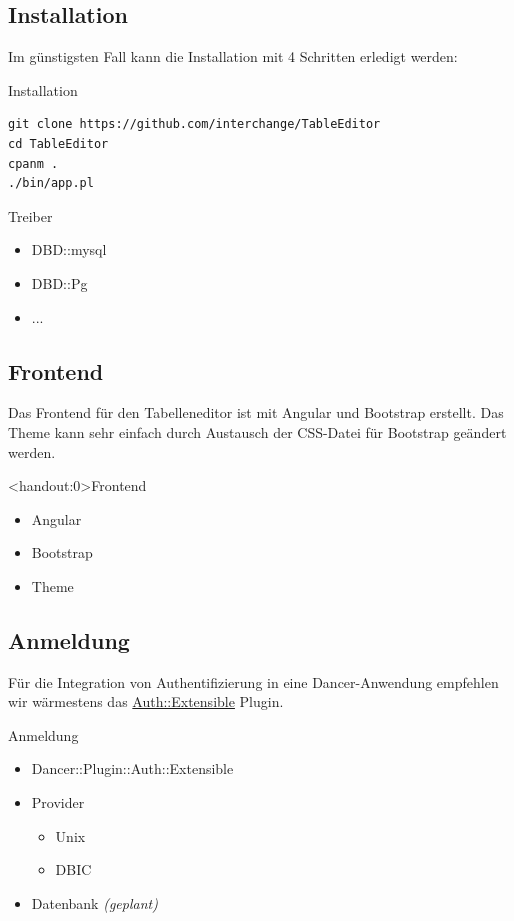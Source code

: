 \subsection{Installation}
Im günstigsten Fall kann die Installation mit 4 Schritten
erledigt werden:

\begin{frame}[fragile]{Installation}
\begin{lstlisting}
git clone https://github.com/interchange/TableEditor
cd TableEditor
cpanm .
./bin/app.pl
\end{lstlisting}
\end{frame}

\begin{frame}[fragile]{Treiber}
\begin{itemize}
\item DBD::mysql
\item DBD::Pg
\item ...
\end{itemize}
\end{frame}

\subsection{Frontend}
Das Frontend für den Tabelleneditor ist mit Angular und Bootstrap erstellt.
Das Theme kann sehr einfach durch Austausch der CSS-Datei für Bootstrap
geändert werden.

\begin{frame}<handout:0>{Frontend}
\begin{itemize}
\item Angular
\item Bootstrap
\item Theme
\end{itemize}
\end{frame}

\subsection{Anmeldung}

Für die Integration von Authentifizierung in eine Dancer-Anwendung empfehlen
wir wärmestens das
\href{https://metacpan.org/pod/Dancer::Plugin::Auth::Extensible}{Auth::Extensible}
Plugin.

\begin{frame}{Anmeldung}
\begin{itemize}
\item Dancer::Plugin::Auth::Extensible
\item Provider
\begin{itemize}
\item Unix
\item DBIC
\end{itemize}
\item Datenbank \textit{(geplant)}
\end{itemize}
\end{frame}

